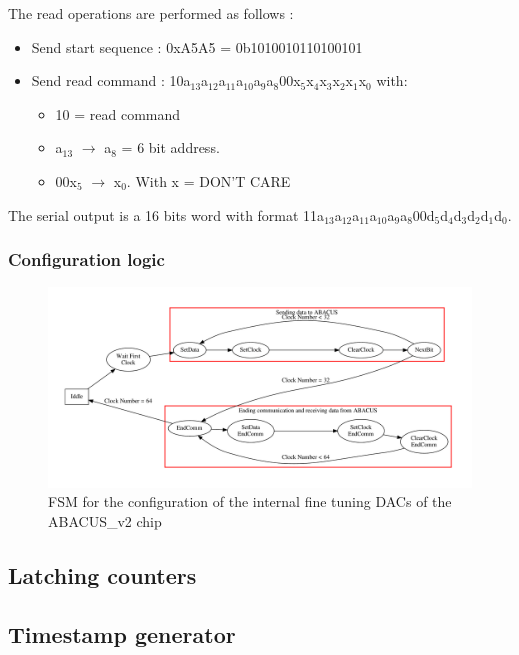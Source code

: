\noindent The read operations are performed as follows :
\begin{itemize}
	\item Send start sequence : 0xA5A5 = 0b1010010110100101
	\item Send read command : 10a$_{13}$a$_{12}$a$_{11}$a$_{10}$a$_{9}$a$_{8}$00x$_{5}$x$_{4}$x$_{3}$x$_{2}$x$_{1}$x$_{0}$ with:
	\begin{itemize}
		\item 10 = read command
		\item a$_{13}$ $\rightarrow$ a$_{8}$ = 6 bit address.
		\item 00x$_{5}$ $\rightarrow$ x$_{0}$. With x = DON'T CARE 
	\end{itemize}
\end{itemize}
\noindent The serial output is a 16 bits word with format 11a$_{13}$a$_{12}$a$_{11}$a$_{10}$a$_{9}$a$_{8}$00d$_{5}$d$_{4}$d$_{3}$d$_{2}$d$_{1}$d$_{0}$.

\subsubsection{Configuration logic}


\begin{figure}[H]
	\centering
	\includegraphics[width=1.0\linewidth]{FSMdiagrams/InternalDACsFSM.pdf}
	\caption{FSM for the configuration of the internal fine tuning DACs of the ABACUS\_v2 chip}
	\label{fig:fsmDACs}
\end{figure}

\subsection{Latching counters}\label{Latch}

\subsection{Timestamp generator}\label{Timestamp}


